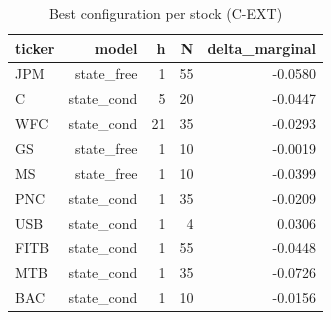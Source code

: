 \documentclass{article}
\begin{document}
\begin{table}[ht]
\centering
\caption{Best configuration per stock (C-EXT)}
\label{tab:best-config}
\begin{tabular}{lrrrr}
\toprule
ticker & model & h & N & delta_marginal \\
\midrule
JPM & state_free & 1 & 55 & -0.0580 \\
C & state_cond & 5 & 20 & -0.0447 \\
WFC & state_cond & 21 & 35 & -0.0293 \\
GS & state_free & 1 & 10 & -0.0019 \\
MS & state_free & 1 & 10 & -0.0399 \\
PNC & state_cond & 1 & 35 & -0.0209 \\
USB & state_cond & 1 & 4 & 0.0306 \\
FITB & state_cond & 1 & 55 & -0.0448 \\
MTB & state_cond & 1 & 35 & -0.0726 \\
BAC & state_cond & 1 & 10 & -0.0156 \\
\bottomrule
\end{tabular}
\end{table}
\end{document}
